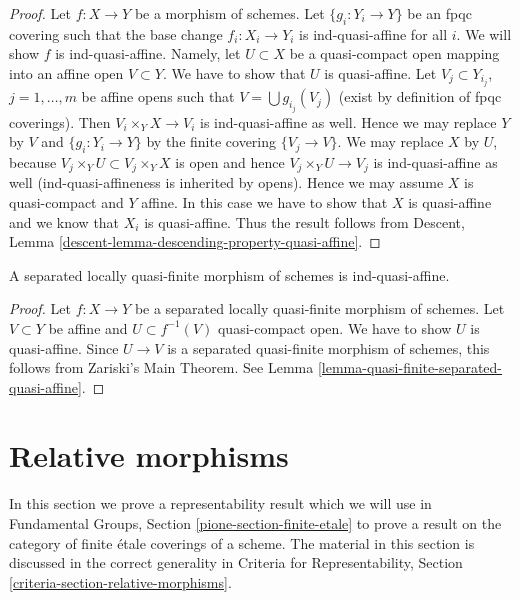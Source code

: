 \begin{proof}
Let $f : X \to Y$ be a morphism of schemes. Let $\{g_i : Y_i \to Y\}$
be an fpqc covering such that the base change $f_i : X_i \to Y_i$
is ind-quasi-affine for all $i$. We will show $f$ is ind-quasi-affine.
Namely, let $U \subset X$ be a quasi-compact open mapping into
an affine open $V \subset Y$. We have to show that $U$ is quasi-affine.
Let $V_j \subset Y_{i_j}$, $j = 1, \ldots, m$ be affine opens
such that $V = \bigcup g_{i_j}(V_j)$ (exist by definition of
fpqc coverings). Then $V_i \times_Y X \to V_i$ is ind-quasi-affine
as well. Hence we may replace $Y$ by $V$ and $\{g_i : Y_i \to Y\}$
by the finite covering $\{V_j \to V\}$. We may replace $X$ by
$U$, because $V_j \times_Y U \subset V_j \times_Y X$ is open and
hence $V_j \times_Y U \to V_j$ is ind-quasi-affine as well
(ind-quasi-affineness is inherited by opens).
Hence we may assume $X$ is quasi-compact and $Y$ affine.
In this case we have to show that $X$ is quasi-affine and we
know that $X_i$ is quasi-affine. Thus the result follows from
Descent, Lemma \ref{descent-lemma-descending-property-quasi-affine}.
\end{proof}

\begin{lemma}
\label{lemma-etale-separated-ind-quasi-affine}
A separated locally quasi-finite morphism of schemes is ind-quasi-affine.
\end{lemma}

\begin{proof}
Let $f : X \to Y$ be a separated locally quasi-finite morphism of schemes.
Let $V \subset Y$ be affine and $U \subset f^{-1}(V)$ quasi-compact
open. We have to show $U$ is quasi-affine. Since $U \to V$ is a
separated quasi-finite morphism of schemes, this follows from
Zariski's Main Theorem. See
Lemma \ref{lemma-quasi-finite-separated-quasi-affine}.
\end{proof}







\section{Relative morphisms}
\label{section-relative-morphisms}

\noindent
In this section we prove a representability result which we will use in
Fundamental Groups, Section \ref{pione-section-finite-etale}
to prove a result on the category of finite \'etale coverings of a scheme.
The material in this section is discussed in the correct
generality in Criteria for Representability, Section
\ref{criteria-section-relative-morphisms}.

